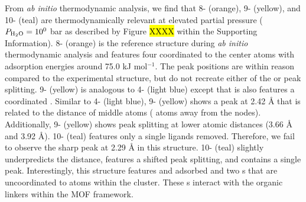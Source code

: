 \documentclass[12pt]{article}
\begin{document}
From \textit{ab initio} thermodynamic analysis, we find that 8- (orange), 9- (yellow), and 10- (teal) are thermodynamically relevant at elevated  partial pressure ($P_{\text{\ce{H2O}}}=10^{0}$ bar as described by Figure \hl{XXXX} within the Supporting Information). 8- (orange) is the reference structure during \textit{ab initio} thermodynamic analysis and features four  coordinated to the center  atoms with  adsorption energies around 75.0 kJ mol$^{-1}$. The peak positions are within reason compared to the experimental structure, but do not recreate either of the  or  peak splitting. 9- (yellow) is analogous to 4- (light blue) except that is also features a coordinated . Similar to 4- (light blue), 9- (yellow) shows a  peak at 2.42 {\AA} that is related to the distance of middle  atoms ( atoms away from the nodes). Additionally, 9- (yellow) shows  peak splitting at lower atomic distances (3.66 {\AA} and 3.92 {\AA}). 10- (teal) features only a single  ligands removed. Therefore, we fail to observe the sharp  peak at 2.29 {\AA} in this structure. 10- (teal) slightly underpredicts the  distance, features a shifted  peak splitting, and contains a single  peak. Interestingly, this structure features  and adsorbed  and two s that are uncoordinated to  atoms within the cluster. These s interact with the organic linkers within the MOF framework.

\end{document}
